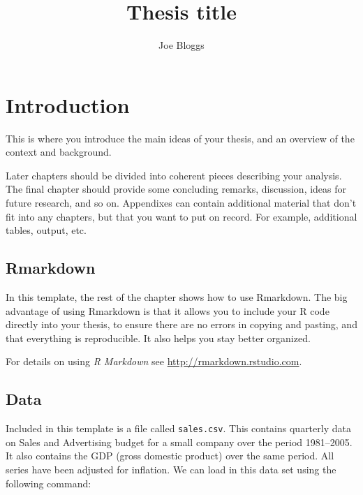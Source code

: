 \documentclass{monashthesis}
\author{Joe Bloggs}
\title{Thesis title}
\begin{document}

\titlepage

{\sf\tighttoc\doublespacing}

\clearpage{}\setcounter{page}{0}

\chapter{Introduction}\label{ch:intro}

This is where you introduce the main ideas of your thesis, and an
overview of the context and background.

Later chapters should be divided into coherent pieces describing your
analysis. The final chapter should provide some concluding remarks,
discussion, ideas for future research, and so on. Appendixes can contain
additional material that don't fit into any chapters, but that you want
to put on record. For example, additional tables, output, etc.

\section{Rmarkdown}\label{rmarkdown}

In this template, the rest of the chapter shows how to use Rmarkdown.
The big advantage of using Rmarkdown is that it allows you to include
your R code directly into your thesis, to ensure there are no errors in
copying and pasting, and that everything is reproducible. It also helps
you stay better organized.

For details on using \emph{R Markdown} see
\url{http://rmarkdown.rstudio.com}.

\section{Data}\label{data}

Included in this template is a file called \texttt{sales.csv}. This
contains quarterly data on Sales and Advertising budget for a small
company over the period 1981--2005. It also contains the GDP (gross
domestic product) over the same period. All series have been adjusted
for inflation. We can load in this data set using the following command:

\begin{Shaded}
\begin{Highlighting}[]
\StringTok{ }\NormalTok{(}\NormalTok{(}\NormalTok{)[,}\OperatorTok{-}\NormalTok{], }\NormalTok{, }\NormalTok{)}
\end{Highlighting}
\end{Shaded}
\end{document}
